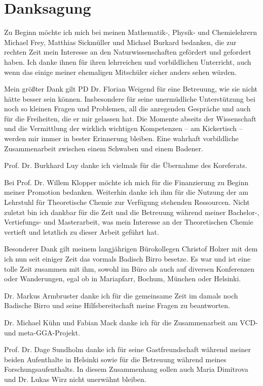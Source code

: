 \chapter*{Danksagung}
\thispagestyle{empty}
Zu Beginn möchte ich mich bei meinen Mathematik-, Physik- und Chemielehrern Michael Frey, Matthias Sickmüller und Michael Burkard bedanken, die zur rechten Zeit mein Interesse an den Naturwissenschaften gefördert und gefordert haben. Ich danke ihnen für ihren lehrreichen und vorbildlichen Unterricht, auch wenn das einige meiner ehemaligen Mitschüler sicher anders sehen würden.

\bigskip
Mein größter Dank gilt PD Dr. Florian Weigend für eine Betreuung, wie sie nicht hätte besser sein können. Insbesondere für seine unermüdliche Unterstützung bei noch so kleinen Fragen und Problemen, all die anregenden Gespräche und auch für die Freiheiten, die er mir gelassen hat. Die Momente abseits der Wissenschaft und die Vermittlung der wirklich wichtigen Kompetenzen -- am Kickertisch -- werden mir immer in bester Erinnerung bleiben. Eine wahrhaft vorbildliche Zusammenarbeit zwischen einem Schwaben und einem Badener.

\bigskip
Prof. Dr. Burkhard Luy danke ich vielmals für die Übernahme des Koreferats.

\bigskip
Bei Prof. Dr. Willem Klopper möchte ich mich für die Finanzierung zu Beginn meiner Promotion bedanken. Weiterhin danke ich ihm für die Nutzung der am Lehrstuhl für Theoretische Chemie zur Verfügung stehenden Ressourcen. Nicht zuletzt bin ich dankbar für die Zeit und die Betreuung während meiner Bachelor-, Vertiefungs- und Masterarbeit, was mein Interesse an der Theoretischen Chemie vertieft und letztlich zu dieser Arbeit geführt hat.

\bigskip
Besonderer Dank gilt meinem langjährigen Bürokollegen Christof Holzer mit dem ich nun seit einiger Zeit das \glqq vormals Badisch Birro\grqq{} besetze. Es war und ist eine tolle Zeit zusammen mit ihm, sowohl im Büro als auch auf diversen Konferenzen oder Wanderungen, egal ob in Mariapfarr, Bochum, München oder Helsinki.

\bigskip
Dr. Markus Armbruster danke ich für die gemeinsame Zeit im damals noch \glqq Badische Birro\grqq{} und seine Hilfsbereitschaft meine Fragen zu beantworten. 

Dr. Michael Kühn und Fabian Mack danke ich für die Zusammenarbeit am VCD- und meta-GGA-Projekt.  

\bigskip
Prof. Dr. Dage Sundholm danke ich für seine Gastfreundschaft während meiner beiden Aufenthalte in Helsinki sowie für die Betreuung während meines Forschungsaufenthalts. In diesem Zusammenhang sollen auch Maria Dimitrova und Dr. Lukas Wirz nicht unerwähnt bleiben.


